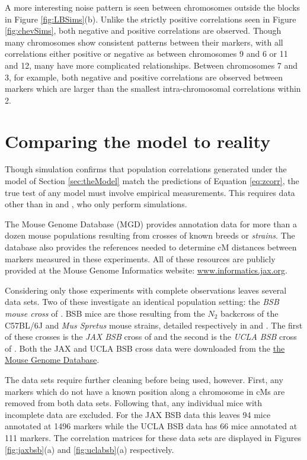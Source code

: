 \documentclass[sts]{imsart}
\begin{document}
A more interesting noise pattern is seen between chromosomes outside the blocks in Figure \ref{fig:LBSims}(b). Unlike the strictly positive correlations seen in Figure \ref{fig:chevSims}, both negative and positive correlations are observed. Though many chromosomes show consistent patterns between their markers, with all correlations either positive or negative as between chromosomes 9 and 6 or 11 and 12, many have more complicated relationships. Between chromosomes 7 and 3, for example, both negative and positive correlations are observed between markers which are larger than the smallest intra-chromosomal correlations within 2.

\section{Comparing the model to reality} \label{sec:model2real}

Though simulation confirms that population correlations generated under the model of Section \ref{sec:theModel} match the predictions of Equation \ref{eq:zcorr}, the true test of any model must involve empirical measurements. This requires data other than in \cite{LanderBotstein1989} and \cite{cheverud2001}, who only perform simulations.

The Mouse Genome Database (MGD) \cite{bultetal2019mouse} provides annotation data for more than a dozen mouse populations resulting from crosses of known breeds or \emph{strains}. The database also provides the references needed to determine cM distances between markers measured in these experiments. All of these resources are publicly provided at the Mouse Genome Informatics website: \href{www.informatics.jax.org}{www.informatics.jax.org}.

Considering only those experiments with complete observations leaves several data sets. Two of these investigate an identical population setting: the \emph{BSB mouse cross} of \cite{fisleretal1993bsb}. BSB mice are those resulting from the $N_2$ backcross of the C57BL/6J and {\it Mus Spretus} mouse strains, detailed respectively in \cite{C57BL6J} and \cite{dejageretal2009mspretus}. The first of these crosses is the \emph{JAX BSB} cross of \cite{roweetal1994jaxbsb} and the second is the \emph{UCLA BSB} cross of \cite{welchetal1996uclabsb}. Both the JAX and UCLA BSB cross data were downloaded from the \href{www.informatics.jax.org/downloads/reports/index.html}{the Mouse Genome Database}.

The data sets require further cleaning before being used, however. First, any markers which do not have a known position along a chromosome in cMs are removed from both data sets. Following that, any individual mice with incomplete data are excluded. For the JAX BSB data this leaves 94 mice annotated at 1496 markers while the UCLA BSB data has 66 mice annotated at 111 markers. The correlation matrices for these data sets are displayed in Figures \ref{fig:jaxbsb}(a) and \ref{fig:uclabsb}(a) respectively.
\end{document}

